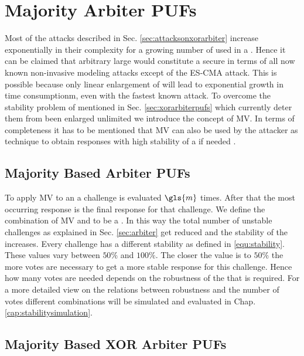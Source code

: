 \chapter{Majority Arbiter PUFs}
\label{cap:majorityarbiter}

Most of the attacks described in Sec. \ref{sec:attacksonxorarbiter} increase exponentially in their complexity for a growing number of used \apufs in a \xpuf. 
Hence it can be claimed that arbitrary large \xpufs would constitute a secure \puf in terms of all now known non-invasive modeling attacks except of the \ac{ES-CMA} attack.
This is possible because only linear enlargement of \xpufs will lead to exponential growth in time consumptionm, even with the fastest known attack.
To overcome the stability problem of \xpufs mentioned in Sec. \ref{sec:xorarbiterpufs} which currently deter them from been enlarged unlimited we introduce the concept of \ac{MV}. %
In terms of completeness it has to be mentioned that \ac{MV} can also be used by the attacker as technique to obtain responses with high stability of a \puf if needed \cite{Ganji2016PACPUFs, Ozturk2008TowardsDevices}.

\section{Majority Based Arbiter PUFs}
\label{sec:majorityarbiter}

To apply \ac{MV} to an \apuf a challenge is evaluated $\gls{m}$ times.
After that the most occurring response is the final response for that challenge.
We define the combination of \ac{MV} and \apuf to be a \mpuf.
In this way the total number of unstable challenges as explained in Sec. \ref{sec:arbiter} get reduced and the stability of the \apuf increases.
Every challenge has a different stability as defined in \ref{equ:stability}.%
These values vary between $50 \%$ and $100 \%$.
The closer the value is to $50 \%$ the more votes are necessary to get a more stable response for this challenge.
Hence how many votes are needed depends on the robustness of the \apuf that is required. 
For a more detailed view on the relations between robustness and the number of votes different combinations will be simulated and evaluated in Chap. \ref{cap:stabilitysimulation}.


\section{Majority Based XOR Arbiter PUFs}
\label{sec:majorityxorarbiter}

